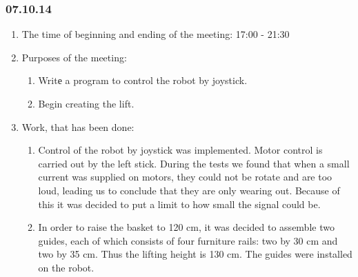 
\subsubsection{07.10.14}

\begin{enumerate}
	\item The time of beginning and ending of the meeting:
	17:00 - 21:30
	\item Purposes of the meeting:
	\begin{enumerate}
	  \item Writе a program to control the robot by joystick.
	  
	  \item Begin creating the lift.
	  
    \end{enumerate}
	\item Work, that has been done:
	\begin{enumerate}
	  \item Control of the robot by joystick was implemented. Motor control is carried out by the left stick. During the tests we found that when a small current was supplied on motors, they could not be rotate and are too loud, leading us to conclude that they are only wearing out. Because of this it was decided to put a limit to how small the signal could be.
	  
      \item  In order to raise the basket to 120 cm, it was decided to assemble two guides, each of which consists of four furniture rails: two by 30 cm and two by 35 cm. Thus the lifting height is 130 cm. The guides were installed on the robot.
      

\end{enumerate}
\end{enumerate}
